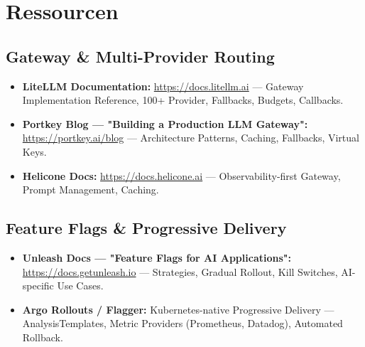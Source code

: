 \section{Ressourcen}

\subsection*{Gateway \& Multi-Provider Routing}
\begin{itemize}[leftmargin=*]
    \item \textbf{LiteLLM Documentation:} \url{https://docs.litellm.ai} — Gateway Implementation Reference, 100+ Provider, Fallbacks, Budgets, Callbacks.
    \item \textbf{Portkey Blog — "Building a Production LLM Gateway":} \url{https://portkey.ai/blog} — Architecture Patterns, Caching, Fallbacks, Virtual Keys.
    \item \textbf{Helicone Docs:} \url{https://docs.helicone.ai} — Observability-first Gateway, Prompt Management, Caching.
\end{itemize}

\subsection*{Feature Flags \& Progressive Delivery}
\begin{itemize}[leftmargin=*]
    \item \textbf{Unleash Docs — "Feature Flags for AI Applications":} \url{https://docs.getunleash.io} — Strategies, Gradual Rollout, Kill Switches, AI-specific Use Cases.
    \item \textbf{Argo Rollouts / Flagger:} Kubernetes-native Progressive Delivery — AnalysisTemplates, Metric Providers (Prometheus, Datadog), Automated Rollback.
\end{itemize}

